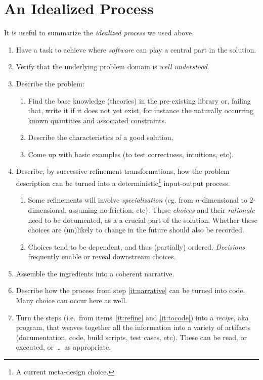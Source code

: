 \documentclass[a4paper,UKenglish,cleveref,autoref,thm-restate]{oasics-v2021}
\begin{document}
\section{An Idealized Process}
\label{sec:idealized-process}

It is useful to summarize the \emph{idealized process} we used above.

\begin{enumerate}
\item\label{it:problem} Have a task to achieve where \emph{software} can
play a central part in the solution.
\item\label{it:understood} Verify that the underlying problem domain is \emph{well
understood}.
\item\label{it:probdesc} Describe the problem:
  \begin{enumerate}
  \item Find the base knowledge (theories) in the pre-existing library or,
    failing that, write it if it does not yet exist, for instance the
    naturally occurring known quantities and associated constraints.
  \item Describe the characteristics of a good solution,
  \item Come up with basic examples (to test correctness, intuitions, etc).
  \end{enumerate}
\item\label{it:refine} Describe, by successive refinement transformations,
how the problem description can be turned into a deterministic\footnote{A current
meta-design choice.} input-output process.
  \begin{enumerate}
  \item Some refinements will involve \emph{specialization} (eg. from
    \(n\)-dimensional to \(2\)-dimensional, assuming no friction, etc).  These
    \emph{choices} and their \emph{rationale} need to be documented, as a a
    crucial part of the solution.  Whether these choices are (un)likely to
    change in the future should also be recorded.
  \item Choices tend to be dependent, and thus (partially) ordered.
   \emph{Decisions} frequently enable or reveal downstream choices.
  \end{enumerate}
\item\label{it:narrative} Assemble the ingredients into a coherent narrative.
\item\label{it:tocode} Describe how the process from step \ref{it:narrative}
can be turned into code. Many choice can occur here as well.
\item\label{it:recipe} Turn the steps (i.e.\ from items~\ref{it:refine} and
\ref{it:tocode}) into a \emph{recipe}, aka program, that weaves together all
the information into a variety of artifacts (documentation, code, build
scripts, test cases, etc). These can be read, or executed, or \ldots\, as
appropriate.
\end{enumerate}
\end{document}
